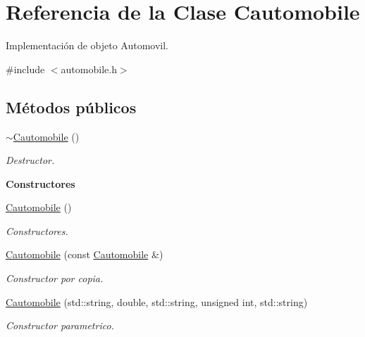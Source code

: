 \hypertarget{class_cautomobile}{}\section{Referencia de la Clase Cautomobile}
\label{class_cautomobile}


Implementación de objeto Automovil.  




{\ttfamily \#include $<$automobile.\+h$>$}

\subsection*{Métodos públicos}
\begin{DoxyCompactItemize}
\item 
\hyperlink{class_cautomobile_aa3a2ca53356fd2f599afb1dffbdd1473}{$\sim$\+Cautomobile} ()\hypertarget{class_cautomobile_aa3a2ca53356fd2f599afb1dffbdd1473}{}\label{class_cautomobile_aa3a2ca53356fd2f599afb1dffbdd1473}

\begin{DoxyCompactList}\small\item\em Destructor. \end{DoxyCompactList}\end{DoxyCompactItemize}
\begin{Indent}{\bf Constructores}\par
\begin{DoxyCompactItemize}
\item 
\hyperlink{class_cautomobile_abd847a15c21f065b4b6fa00fec9a553a}{Cautomobile} ()
\begin{DoxyCompactList}\small\item\em Constructores. \end{DoxyCompactList}\item 
\hyperlink{class_cautomobile_a3dff087e063cba889005398eada539fd}{Cautomobile} (const \hyperlink{class_cautomobile}{Cautomobile} \&)
\begin{DoxyCompactList}\small\item\em Constructor por copia. \end{DoxyCompactList}\item 
\hyperlink{class_cautomobile_a935f9292ea591bf928a1f54914b7057c}{Cautomobile} (std\+::string, double, std\+::string, unsigned int, std\+::string)
\begin{DoxyCompactList}\small\item\em Constructor parametrico. \end{DoxyCompactList}\end{DoxyCompactItemize}
\end{Indent}
